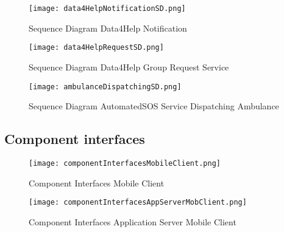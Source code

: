 \documentclass[../main.tex]{subfiles}
\begin{document}
\vspace*{2cm}

\begin{figure}[H]
        \centering
             \texttt{[image: data4HelpNotificationSD.png]}
              \caption{Sequence Diagram Data4Help Notification  }
               \label{fig:data4HelpSD}
\end{figure}

\vspace*{2cm}

\begin{figure}[H]
        \centering
             \texttt{[image: data4HelpRequestSD.png]}
              \caption{Sequence Diagram Data4Help Group Request Service }
               \label{fig:data4HelpRequestSD}
\end{figure}

\vspace*{2cm}

\begin{figure}[H]
        \centering
             \texttt{[image: ambulanceDispatchingSD.png]}
              \caption{Sequence Diagram AutomatedSOS Service Dispatching Ambulance}
               \label{fig:ambulanceDispatchingSD}
\end{figure}

\subsection{Component interfaces}

\begin{figure}[H]
        \centering
             \texttt{[image: componentInterfacesMobileClient.png]}
              \caption{Component Interfaces Mobile Client }
               \label{fig:componentInterfacesMobileClient}
\end{figure}

\vspace*{2cm}

\begin{figure}[H]
        \centering
             \texttt{[image: componentInterfacesAppServerMobClient.png]}
              \caption{Component Interfaces Application Server Mobile Client}
               \label{fig:componentInterfacesAppServerMobClient}
\end{figure}

\vspace*{2cm}
\end{document}
